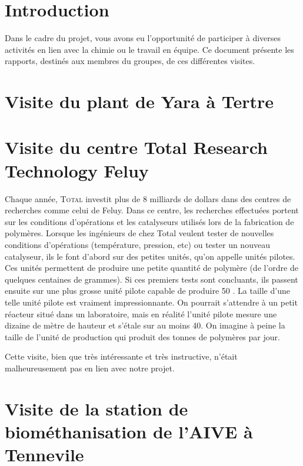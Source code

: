 

\section{Introduction}
Dans le cadre du projet, vous avons eu l'opportunité de 
participer à diverses activités en lien avec la chimie ou
le travail en équipe. Ce document présente les rapports, 
destinés aux membres du groupes, de ces différentes visites.

\section{Visite du plant de Yara à Tertre}

\section{Visite du centre Total Research Technology Feluy}
Chaque année, \textsc{Total} investit plus de 8 milliards de
dollars dans des centres de recherches comme celui de Feluy.
Dans ce centre, les recherches effectuées portent sur les
conditions d'opérations et les catalyseurs utilisés lors de 
la fabrication de polymères. Lorsque les ingénieurs de chez
Total veulent tester de nouvelles conditions d'opérations
(température, pression, etc) ou tester un nouveau catalyseur,
ils le font d'abord sur des petites unités, qu'on appelle unités
pilotes. Ces unités permettent de produire une petite quantité
de polymère (de l'ordre de quelques centaines de grammes). Si
ces premiers tests sont concluants, ils passent ensuite sur une
plus grosse unité pilote capable de produire \unit{50}{\kilo\gram
\per\dday}. La taille d'une telle unité pilote est vraiment
impressionnante. On pourrait s'attendre à un petit réacteur situé
dans un laboratoire, mais en réalité l'unité pilote mesure une dizaine
de mètre de hauteur et s'étale sur au moins \unit{40}{\meter\squared}.
On imagine à peine la taille de l'unité de production qui produit
des tonnes de polymères par jour.

Cette visite, bien que très intéressante et très instructive, n'était
malheureusement pas en lien avec notre projet.

\section{Visite de la station de biométhanisation de l'AIVE à Tennevile}

